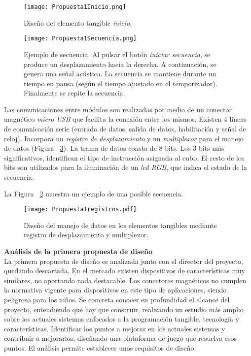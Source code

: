 \begin{figure}[!h]
\begin{center}
\texttt{[image: Propuesta1Inicio.png]}
\caption{Diseño del elemento tangible \emph{inicio}.}
\label{fig:Elementoinicio}
\end{center}
\end{figure}

\begin{figure}[!h]
\begin{center}
\texttt{[image: Propuesta1Secuencia.png]}
\caption{Ejemplo de secuencia. Al pulsar el botón \emph{iniciar secuencia}, se produce un desplazamiento hacia la derecha. A continuación, se genera una señal acústica. La secuencia se mantiene durante un tiempo en pausa (según el tiempo ajustado en el temporizador). Finalmente se repite la secuencia.}
\label{fig:Secuencia}
\end{center}
\end{figure}

Las comunicaciones entre módulos son realizadas por medio de un conector magnético \emph{micro USB} que facilita la conexión entre los mismos. Existen 4 líneas de comunicación serie (entrada de datos, salida de datos, habilitación y señal de reloj). Incorpora un \emph{registro de desplazamiento} y un \emph{multiplexor} para el manejo de datos (Figura ~\ref{fig:Registros}).
La trama de datos consta de 8 bits. Los 3 bits más significativos, identifican el tipo de instrucción asignada al cubo. El resto de los bits son utilizados para la iluminación de un \emph{led RGB}, que indica el estado de la secuencia.

La Figura ~\ref{fig:Secuencia} muestra un ejemplo de una posible secuencia.

\begin{figure}[!h]
\begin{center}
\texttt{[image: Propuesta1registros.pdf]}
\caption{Diseño del manejo de datos en los elementos tangibles mediante registro de desplazamiento y multiplexor.}
\label{fig:Registros}
\end{center}
\end{figure}


\textbf{Análisis de la primera propuesta de diseño}\\
La primera propuesta de diseño es analizada junto con el director del proyecto, quedando descartada. 
En el mercado existen dispositivos de características muy similares, no aportando nada destacable. Los conectores magnéticos no cumplen la normativa vigente para dispositivos en este tipo de aplicaciones, siendo peligroso para los niños.
Se concreta conocer en profundidad el alcance del proyecto, entendiendo que hay que construir, realizando un estudio más amplio sobre los actuales sistemas enfocados a la programación tangible, tecnología y características. Identificar los puntos a mejorar en los actuales sistemas y contribuir a mejorarlos, diseñando una plataforma de juego que resuelva esos puntos. El análisis permite establecer unos requisitos de diseño.




